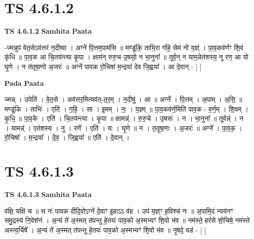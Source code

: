 \documentclass[17pt]{extarticle}
\begin{document}
\section*{ TS 4.6.1.2 }

\textbf{TS 4.6.1.2 } \newline
\textbf{Samhita Paata} \newline

-ज्मन्नुप॑ वेत॒सेऽव॑त्तरं न॒दीष्वा । अग्ने॑ पि॒त्तम॒पाम॑सि ॥ मण्डू॑कि॒ ताभि॒रा ग॑हि॒ सेमं नो॑ य॒ज्ञ्ं । पा॒व॒कव॑र्णꣳ शि॒वं कृ॑धि ॥ पा॒व॒क आ चि॒तय॑न्त्या कृ॒पा । क्षाम॑न् रुरु॒च उ॒षसो॒ न भा॒नुना᳚ ॥ तूर्व॒न् न याम॒न्नेत॑शस्य॒ नू रण॒ आ यो घृ॒णे । न त॑तृषा॒णो अ॒जरः॑ ॥ अग्ने॑ पावक रो॒चिषा॑ म॒न्द्रया॑ देव जि॒ह्वया᳚ । आ दे॒वान् - [  ] \newline

\textbf{Pada Paata} \newline

ज्मन्न् । उपेति॑ । वे॒त॒से । अव॑त्तर॒मित्यव॑त्-त॒र॒म् । न॒दीषु॑ । आ ॥ अग्ने᳚ । पि॒त्तम् । अ॒पाम् । अ॒सि॒ ॥ मण्डू॑कि । ताभिः॑ । एति॑ । ग॒हि॒ । सा । इ॒मम् । नः॒ । य॒ज्ञ्म् ॥ पा॒व॒कव॑र्ण॒मिति॑ पाव॒क - व॒र्ण॒म् । शि॒वम् । कृ॒धि॒ ॥ पा॒व॒के । एति॑ । चि॒तय॑न्त्या । कृ॒पा ॥ क्षामन्न्॑ । रु॒रु॒चे । उ॒षसः॑ । न । भा॒नुना᳚ ॥ तूर्वन्न्॑ । न । यामन्न्॑ । एत॑शस्य । नु । रणे᳚ । एति॑ । यः । घृ॒णे ॥ न । त॒तृ॒षा॒णः । अ॒जरः॑ ॥ अग्ने᳚ । पा॒व॒क॒ । रो॒चिषा᳚ । म॒न्द्रया᳚ । दे॒व॒ । जि॒ह्वया᳚ ॥ एति॑ । दे॒वान् ।  \newline




\section*{ TS 4.6.1.3 }

\textbf{TS 4.6.1.3 } \newline
\textbf{Samhita Paata} \newline

व॑क्षि॒ यक्षि॑ च ॥ स नः॑ पावक दीदि॒वोऽग्ने॑ दे॒वाꣳ इ॒हाऽऽ व॑ह । उप॑ य॒ज्ञ्ꣳ ह॒विश्च॑ नः ॥ अ॒पामि॒दं न्यय॑नꣳ समु॒द्रस्य॑ नि॒वेश॑नं । अ॒न्यं ते॑ अ॒स्मत् त॑पन्तु हे॒तयः॑ पाव॒को अ॒स्मभ्यꣳ॑ शि॒वो भ॑व ॥ नम॑स्ते॒ हर॑से शो॒चिषे॒ नम॑स्ते अस्त्व॒र्चिषे᳚ । अ॒न्यं ते॑ अ॒स्मत् त॑पन्तु हे॒तयः॑ पाव॒को अ॒स्मभ्यꣳ॑ शि॒वो भ॑व ॥ नृ॒षदे॒ वड॑ - [  ] \newline
\end{document}
